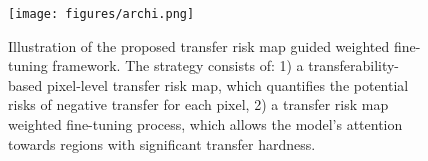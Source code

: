
\begin{figure}
    \vspace{-0.5cm}
    \centering
    \texttt{[image: figures/archi.png]}
    \caption{Illustration of the proposed transfer risk map guided weighted fine-tuning framework. 
    The strategy consists of: 1) a transferability-based pixel-level transfer risk map, which quantifies the potential risks of negative transfer for each pixel, 2) a transfer risk map weighted fine-tuning process, which allows the model's attention towards regions with significant transfer hardness.
    }
    \label{architecture}
    \vspace{-0.5cm}
\end{figure}